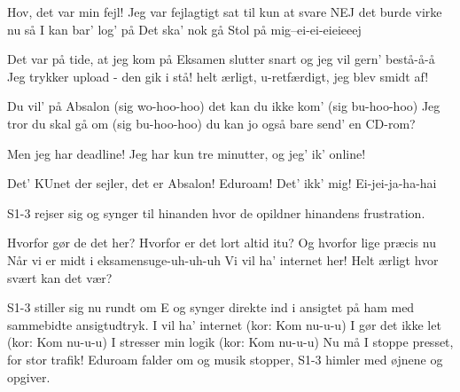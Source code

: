 \documentclass[a4paper,11pt]{article}
\begin{document}
\begin{song}

%
  Hov, det var min fejl!
  Jeg var fejlagtigt sat til kun at svare NEJ
  det burde virke nu så I kan bar' log' på
  Det ska' nok gå
  Stol på mig--ei-ei-eieieeej

%
  Det var på tide, at jeg kom på
  Eksamen slutter snart og jeg vil gern' bestå-å-å
  Jeg trykker upload - den gik i stå!
  helt ærligt, u-retfærdigt, jeg blev smidt af!


%
  Du vil' på Absalon (sig wo-hoo-hoo)
  det kan du ikke kom' (sig bu-hoo-hoo)
  Jeg tror du skal gå om (sig bu-hoo-hoo)
  du kan jo også bare send' en CD-rom?

%
  Men jeg har deadline!
  Jeg har kun tre minutter, og jeg' ik' online!

 Det' KUnet der sejler, det er Absalon! 
 Eduroam!
 Det' ikk' mig! Ei-jei-ja-ha-hai

\scene S1-3 rejser sig og synger til hinanden hvor de opildner hinandens frustration.

%
  Hvorfor gør de det her?
  Hvorfor er det lort altid itu? 
%
  Og hvorfor lige præcis nu
  Når vi er midt i eksamensuge-uh-uh-uh
%
  Vi vil ha' internet her!
  Helt ærligt hvor svært kan det vær?

\scene S1-3 stiller sig nu rundt om E og synger direkte ind i ansigtet på ham med sammebidte ansigtudtryk.
%
  I vil ha' internet (kor: Kom nu-u-u)
  I gør det ikke let (kor: Kom nu-u-u)
  I stresser min logik (kor: Kom nu-u-u)
  Nu må I stoppe presset, for stor trafik!
\scene Eduroam falder om og musik stopper, S1-3 himler med øjnene og opgiver.



\end{song}
\end{document}
